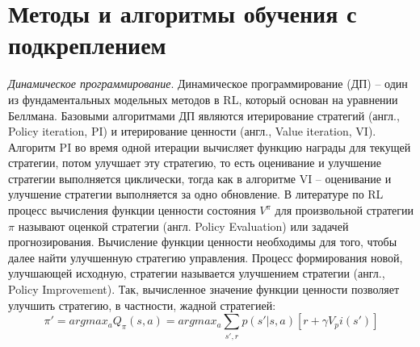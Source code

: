 \section{Методы и алгоритмы обучения с подкреплением}
\label{ch1:sec6}
\textit{Динамическое программирование}. Динамическое программирование (ДП) -- один из фундаментальных модельных методов в RL, который основан на уравнении Беллмана. Базовыми алгоритмами ДП являются итерирование стратегий (англ., Policy iteration, PI)  и итерирование ценности (англ., Value iteration, VI). Алгоритм PI во время одной итерации вычисляет функцию награды для текущей стратегии, потом улучшает эту стратегию, то есть оценивание и улучшение стратегии выполняется циклически, тогда как в алгоритме VI -- оценивание и улучшение стратегии выполняется за одно обновление.
В литературе по RL процесс вычисления функции ценности состояния $V^{\pi}$ для произвольной стратегии $\pi$ называют оценкой стратегии (англ. Policy Evaluation) или задачей прогнозирования. Вычисление функции ценности необходимы для того, чтобы далее найти улучшенную стратегию управления. Процесс формирования новой, улучшающей исходную, стратегии называется улучшением стратегии (англ., Policy Improvement). Так, вычисленное значение функции ценности позволяет улучшить стратегию, в частности, жадной стратегией:
\begin{equation*}
\pi' = argmax_a Q_{\pi}(s, a) = argmax_a \sum_{s',r}p(s'|s,a)[r + \gamma V_pi(s')]
\end{equation*}


